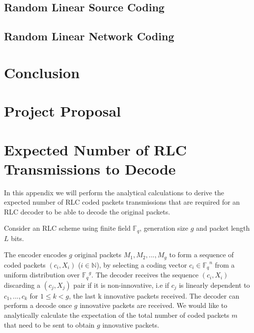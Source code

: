 \documentclass[12pt,a4paper,twoside,openright]{report}
\begin{document}
\section{Random Linear Source Coding} \label{sec:rlsc}

\section{Random Linear Network Coding} \label{sec:rlnc}

\chapter{Conclusion} \label{ch:conc}



\appendix

\chapter{Project Proposal}
\label{ch:proposal}



\chapter{Expected Number of RLC Transmissions to Decode} \label{app:bound}

In this appendix we will perform the analytical calculations to derive the expected number of RLC coded packets transmissions that are required for an RLC decoder to be able to decode the original packets. 

Consider an RLC scheme using finite field $\mathbb{F}_q$, generation size $g$ and packet length $L$ bits.

The encoder encodes $g$ original packets $M_1, M_2, ..., M_g$ to form a sequence of coded packets $(c_i, X_i)$ ($i \in \mathbb{N}$), by selecting a coding vector $c_i \in {\mathbb{F}_q}^ n$ from a uniform distribution over ${\mathbb{F}_q}^ g$. The decoder receives the sequence $(c_i, X_i)$ discarding a $(c_{j}, X_{j})$ pair if it is non-innovative, i.e if $c_{j}$ is linearly dependent to $c_1, ..., c_k$ for $1 \leq k < g$, the last k innovative packets received. The decoder can perform a decode once $g$ innovative packets are received. We would like to analytically calculate the expectation of the total number of coded packets $m$ that need to be sent to obtain $g$ innovative packets.
\end{document}
